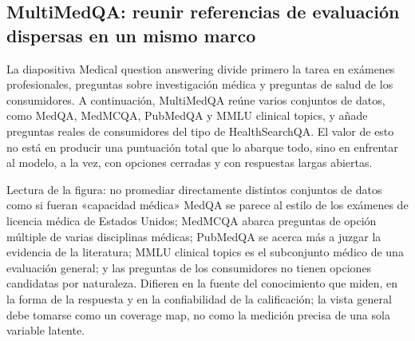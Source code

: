 \subsection{MultiMedQA: reunir referencias de evaluación dispersas en un mismo marco}

La diapositiva Medical question answering divide primero la tarea en exámenes profesionales, preguntas sobre investigación médica y preguntas de salud de los consumidores. A continuación, MultiMedQA reúne varios conjuntos de datos, como MedQA, MedMCQA, PubMedQA y MMLU clinical topics, y añade preguntas reales de consumidores del tipo de HealthSearchQA. El valor de esto no está en producir una puntuación total que lo abarque todo, sino en enfrentar al modelo, a la vez, con opciones cerradas y con respuestas largas abiertas.





\begin{knowledgebox}{Lectura de la figura: no promediar directamente distintos conjuntos de datos como si fueran «capacidad médica»}
MedQA se parece al estilo de los exámenes de licencia médica de Estados Unidos; MedMCQA abarca preguntas de opción múltiple de varias disciplinas médicas; PubMedQA se acerca más a juzgar la evidencia de la literatura; MMLU clinical topics es el subconjunto médico de una evaluación general; y las preguntas de los consumidores no tienen opciones candidatas por naturaleza. Difieren en la fuente del conocimiento que miden, en la forma de la respuesta y en la confiabilidad de la calificación; la vista general debe tomarse como un coverage map, no como la medición precisa de una sola variable latente.
\end{knowledgebox}

